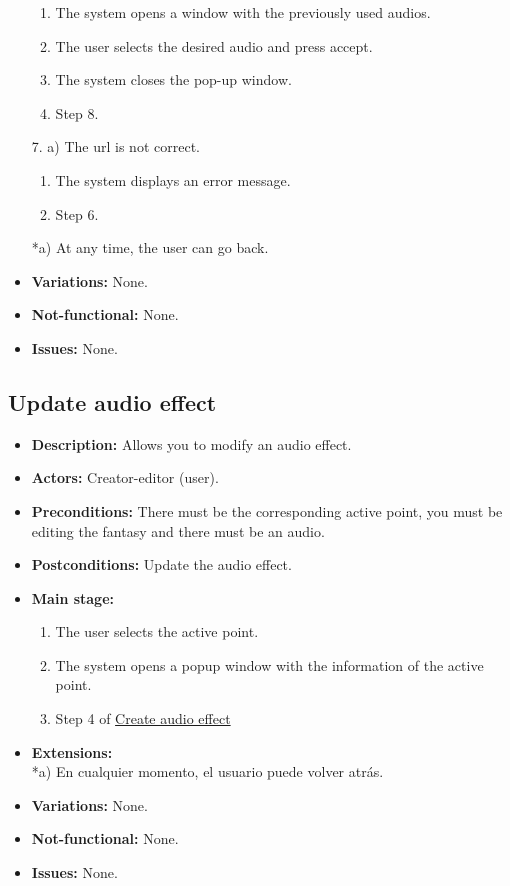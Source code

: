\begin{itemize}
\begin{enumerate}
		\item The system opens a window with the previously used audios.
		\item The user selects the desired audio and press accept.
		\item The system closes the pop-up window.
		\item Step 8.
	\end{enumerate}
	7. a) The url is not correct.
	\begin{enumerate}
		\item The system displays an error message.
		\item Step 6.
	\end{enumerate}
	*a) At any time, the user can go back.
	\item \textbf{Variations:} None.
	\item \textbf{Not-functional:} None.
	\item \textbf{Issues:} None.
\end{itemize}

\subsection{Update audio effect}
\begin{itemize}
	\item \textbf{Description:} Allows you to modify an audio effect.
	\item \textbf{Actors:} Creator-editor (user).
	\item \textbf{Preconditions:} There must be the corresponding active point, you must be editing the fantasy and there must be an audio.
	\item \textbf{Postconditions:} Update the audio effect.
	\item \textbf{Main stage:}
	\begin{enumerate}
		\item The user selects the active point.
		\item The system opens a popup window with the information of the active point.
		\item Step 4 of \hyperlink{crearaudio}{Create audio effect}
	\end{enumerate}
	\item \textbf{Extensions:} \\ *a) En cualquier momento, el usuario puede volver atrás.
	\item \textbf{Variations:} None.
	\item \textbf{Not-functional:} None.
	\item \textbf{Issues:} None.
\end{itemize}

